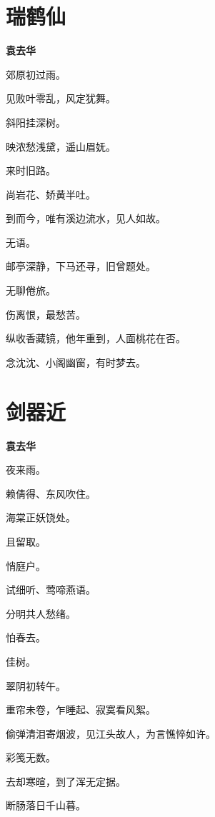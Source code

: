 \documentclass[12pt,a4paper]{ctexbook}
\begin{document}
\section{瑞鹤仙}
\textbf{袁去华}\par\vspace{0.5em}
郊原初过雨。\par
见败叶零乱，风定犹舞。\par
斜阳挂深树。\par
映浓愁浅黛，遥山眉妩。\par
来时旧路。\par
尚岩花、娇黄半吐。\par
到而今，唯有溪边流水，见人如故。\par
无语。\par
邮亭深静，下马还寻，旧曾题处。\par
无聊倦旅。\par
伤离恨，最愁苦。\par
纵收香藏镜，他年重到，人面桃花在否。\par
念沈沈、小阁幽窗，有时梦去。\par

\section{剑器近}
\textbf{袁去华}\par\vspace{0.5em}
夜来雨。\par
赖倩得、东风吹住。\par
海棠正妖饶处。\par
且留取。\par
悄庭户。\par
试细听、莺啼燕语。\par
分明共人愁绪。\par
怕春去。\par
佳树。\par
翠阴初转午。\par
重帘未卷，乍睡起、寂寞看风絮。\par
偷弹清泪寄烟波，见江头故人，为言憔悴如许。\par
彩笺无数。\par
去却寒暄，到了浑无定据。\par
断肠落日千山暮。\par
\end{document}
